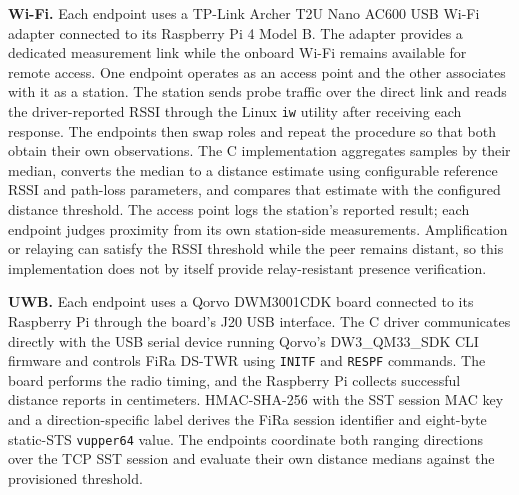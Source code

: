\documentclass[sigconf,authordraft]{acmart}
\begin{document}
\noindent
\textbf{Wi-Fi.}
Each endpoint uses a TP-Link Archer T2U Nano AC600 USB Wi-Fi adapter connected to its Raspberry Pi 4 Model B.
The adapter provides a dedicated measurement link while the onboard Wi-Fi remains available for remote access.
One endpoint operates as an access point and the other associates with it as a station.
The station sends probe traffic over the direct link and reads the driver-reported RSSI through the Linux \texttt{iw} utility after receiving each response.
The endpoints then swap roles and repeat the procedure so that both obtain their own observations.
The C implementation aggregates samples by their median, converts the median to a distance estimate using configurable reference RSSI and path-loss parameters, and compares that estimate with the configured distance threshold.
The access point logs the station's reported result; each endpoint judges proximity from its own station-side measurements.
Amplification or relaying can satisfy the RSSI threshold while the peer remains distant, so this implementation does not by itself provide relay-resistant presence verification.

\noindent
\textbf{UWB.}
Each endpoint uses a Qorvo DWM3001CDK board connected to its Raspberry Pi through the board's J20 USB interface.
The C driver communicates directly with the USB serial device running Qorvo's DW3\_QM33\_SDK CLI firmware and controls FiRa DS-TWR using \texttt{INITF} and \texttt{RESPF} commands.
The board performs the radio timing, and the Raspberry Pi collects successful distance reports in centimeters.
HMAC-SHA-256 with the SST session MAC key and a direction-specific label derives the FiRa session identifier and eight-byte static-STS \texttt{vupper64} value.
The endpoints coordinate both ranging directions over the TCP SST session and evaluate their own distance medians against the provisioned threshold.

\end{document}
